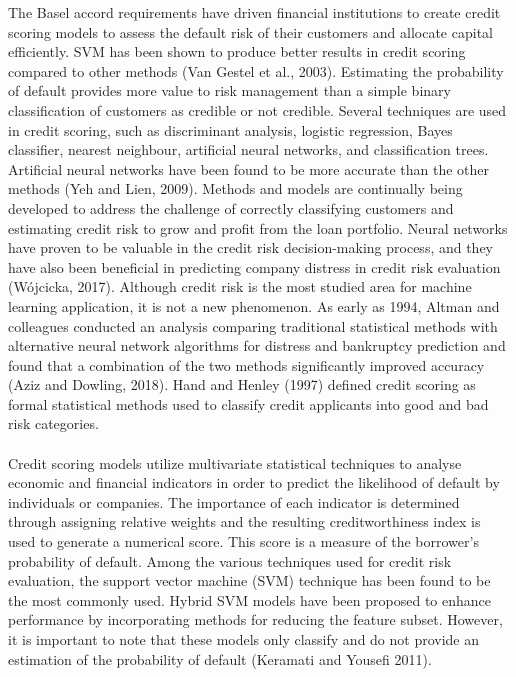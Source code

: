 The Basel accord requirements have driven financial institutions to create credit scoring models to assess the
default risk of their customers and allocate capital efficiently. SVM has been shown to produce better results in
credit scoring compared to other methods (Van Gestel et al., 2003). Estimating the probability of default provides
more value to risk management than a simple binary classification of customers as credible or not credible.
Several techniques are used in credit scoring, such as discriminant analysis, logistic regression, Bayes
classifier, nearest neighbour, artificial neural networks, and classification trees. Artificial neural networks
have been found to be more accurate than the other methods (Yeh and Lien, 2009). Methods and models are
continually being developed to address the challenge of correctly classifying customers and estimating credit
risk to grow and profit from the loan portfolio. Neural networks have proven to be valuable in the credit
risk decision-making process, and they have also been beneficial in predicting company distress in credit
risk evaluation (Wójcicka, 2017). Although credit risk is the most studied area for machine learning
application, it is not a new phenomenon. As early as 1994, Altman and colleagues conducted an analysis
comparing traditional statistical methods with alternative neural network algorithms for distress and
bankruptcy prediction and found that a combination of the two methods significantly improved accuracy
(Aziz and Dowling, 2018). Hand and Henley (1997) defined credit scoring as formal statistical methods
used to classify credit applicants into good and bad risk categories.\\\\
Credit scoring models utilize multivariate statistical techniques to analyse economic and financial indicators in
order to predict the likelihood of default by individuals or companies. The importance of each indicator is
determined through assigning relative weights and the resulting creditworthiness index is used to generate a
numerical score. This score is a measure of the borrower's probability of default. Among the various techniques
used for credit risk evaluation, the support vector machine (SVM) technique has been found to be the most
commonly used. Hybrid SVM models have been proposed to enhance performance by incorporating methods for
reducing the feature subset. However, it is important to note that these models only classify and do not
provide an estimation of the probability of default (Keramati and Yousefi 2011).\\\\
